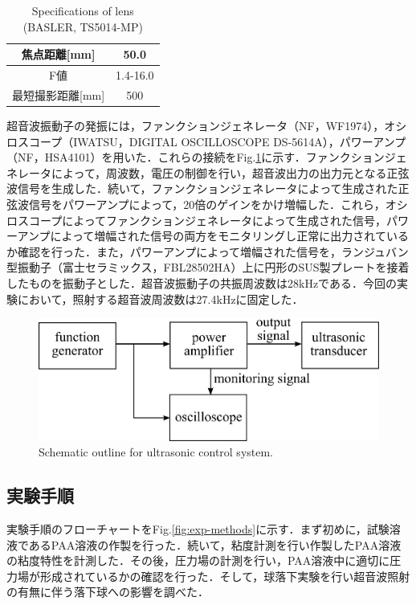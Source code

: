 \begin{table}[ht]
    \centering
    \caption{Specifications of lens (BASLER, TS5014-MP)}
    \label{table:lens}
    \begin{tabular}{c|c}\hline
        焦点距離[mm]     & 50.0     \\ \hline
        F値              & 1.4-16.0 \\ \hline
        最短撮影距離[mm] & 500      \\ \hline
    \end{tabular}
\end{table}

超音波振動子の発振には，ファンクションジェネレータ（NF，WF1974），オシロスコープ（IWATSU，DIGITAL OSCILLOSCOPE DS-5614A），パワーアンプ（NF，HSA4101）を用いた．これらの接続をFig.\ref{fig:connect-with-signal}に示す．ファンクションジェネレータによって，周波数，電圧の制御を行い，超音波出力の出力元となる正弦波信号を生成した．続いて，ファンクションジェネレータによって生成された正弦波信号をパワーアンプによって，20倍のゲインをかけ増幅した．これら，オシロスコープによってファンクションジェネレータによって生成された信号，パワーアンプによって増幅された信号の両方をモニタリングし正常に出力されているか確認を行った．また，パワーアンプによって増幅された信号を，ランジュバン型振動子（富士セラミックス，FBL28502HA）上に円形のSUS製プレートを接着したものを振動子とした．超音波振動子の共振周波数は28kHzである．今回の実験において，照射する超音波周波数は27.4kHzに固定した．

\begin{figure}[h]
    \centering
    \includegraphics[clip,width=13.0cm]{2-Methods/connect-with-signal.png}
    \caption{Schematic outline for ultrasonic control system.}
    \label{fig:connect-with-signal}
\end{figure}

\subsection{実験手順}

実験手順のフローチャートをFig.\ref{fig:exp-methods}に示す．まず初めに，試験溶液であるPAA溶液の作製を行った．続いて，粘度計測を行い作製したPAA溶液の粘度特性を計測した．その後，圧力場の計測を行い，PAA溶液中に適切に圧力場が形成されているかの確認を行った．そして，球落下実験を行い超音波照射の有無に伴う落下球への影響を調べた．

